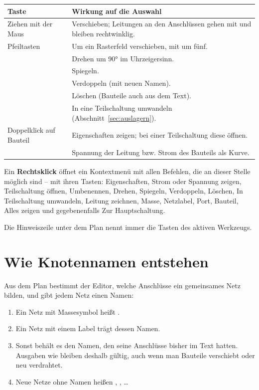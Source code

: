 \begin{center}
\begin{tabularx}{\textwidth}{@{}P{4.2cm}L@{}}
  \toprule
  Taste & Wirkung auf die Auswahl \\
  \midrule
  Ziehen mit der Maus & Verschieben; Leitungen an den Anschlüssen gehen mit und bleiben rechtwinklig. \\
  Pfeiltasten & Um ein Rasterfeld verschieben, mit  um fünf. \\
   & Drehen um 90° im Uhrzeigersinn. \\
   & Spiegeln. \\
   & Verdoppeln (mit neuen Namen). \\
   & Löschen (Bauteile auch aus dem Text). \\
   & In eine Teilschaltung umwandeln (Abschnitt~\ref{sec:auslagern}). \\
  Doppelklick auf Bauteil & Eigenschaften zeigen; bei einer Teilschaltung diese öffnen. \\
   & Spannung der Leitung bzw. Strom des Bauteils als Kurve. \\
  \bottomrule
\end{tabularx}
\end{center}

Ein \textbf{Rechtsklick} öffnet ein Kontextmenü mit allen Befehlen, die an
dieser Stelle möglich sind – mit ihren Tasten: Eigenschaften, Strom oder
Spannung zeigen, Teilschaltung öffnen, Umbenennen, Drehen, Spiegeln,
Verdoppeln, Löschen, In Teilschaltung umwandeln, Leitung zeichnen, Masse,
Netzlabel, Port, Bauteil, Alles zeigen und gegebenenfalls Zur
Hauptschaltung.

Die Hinweiszeile unter dem Plan nennt immer die Tasten des aktiven
Werkzeugs.

\section{Wie Knotennamen entstehen}

Aus dem Plan bestimmt der Editor, welche Anschlüsse ein gemeinsames Netz
bilden, und gibt jedem Netz einen Namen:

\begin{enumerate}
  \item Ein Netz mit Massesymbol heißt .
  \item Ein Netz mit einem Label trägt dessen Namen.
  \item Sonst behält es den Namen, den seine Anschlüsse bisher im Text
    hatten. Ausgaben wie  bleiben deshalb gültig, auch wenn man
    Bauteile verschiebt oder neu verdrahtet.
  \item Neue Netze ohne Namen heißen , , \dots
\end{enumerate}

